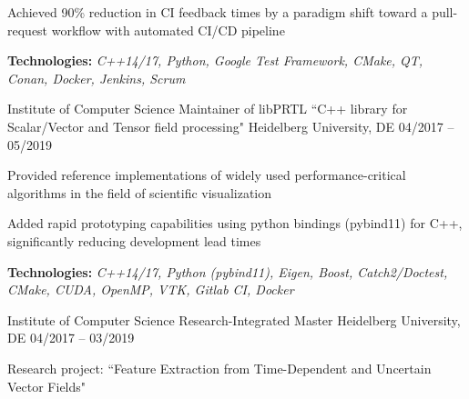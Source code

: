 \begin{cventries}
{\begin{cvitems}
        \item {Achieved 90\% reduction in CI feedback times by a paradigm shift toward a pull-request workflow with automated CI/CD pipeline}
        \item {\textbf{Technologies:} \textit{C++14/17, Python, Google Test Framework, CMake, QT, Conan, Docker, Jenkins, Scrum}}
      \end{cvitems}
    }
    \cventry
    {Institute of Computer Science }
    {Maintainer of libPRTL ``C++ library for Scalar/Vector and Tensor field processing"}
    {Heidelberg University, DE}
    {04/2017 -- 05/2019}
    {
      \begin{cvitems}
        \item {Provided reference implementations of widely used performance-critical algorithms in the field of scientific visualization}
        \item {Added rapid prototyping capabilities using python bindings (pybind11) for C++, significantly reducing development lead times}
        \item {\textbf{Technologies:} \textit{C++14/17, Python (pybind11), Eigen, Boost, Catch2/Doctest, CMake, CUDA, OpenMP, VTK, Gitlab CI, Docker}}
      \end{cvitems}
    }
    \cventry
    {Institute of Computer Science}
    {Research-Integrated Master }
    {Heidelberg University, DE}
    {04/2017 -- 03/2019}
    {
      \begin{cvitems}
        \item {Research project: ``Feature Extraction from Time-Dependent and Uncertain Vector Fields"}

\end{cvitems}}
\end{cventries}
